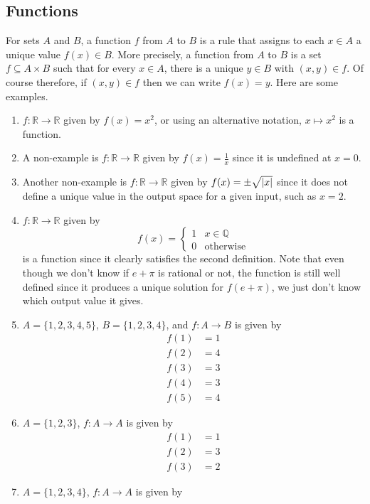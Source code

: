 \documentclass{article}
\begin{document}
	\subsection{Functions}
	For sets $A$ and $B$, a function $f$ from $A$ to $B$ is a rule that assigns to each $x \in A$ a unique value $f(x) \in B$. More precisely, a function from $A$ to $B$ is a set $f \subseteq A \times B$ such that for every $x \in A$, there is a unique $y \in B$ with $(x, y) \in f$. Of course therefore, if $(x, y) \in f$ then we can write $f(x) = y$. Here are some examples.
	\begin{enumerate}
		\item $f\colon \mathbb R \to \mathbb R$ given by $f(x) = x^2$, or using an alternative notation, $x \mapsto x^2$ is a function.
		\item A non-example is $f\colon \mathbb R \to \mathbb R$ given by $f(x) = \frac{1}{x}$ since it is undefined at $x=0$.
		\item Another non-example is $f\colon \mathbb R \to \mathbb R$ given by $f(x) = \pm \sqrt{\abs{x}}$ since it does not define a unique value in the output space for a given input, such as $x=2$.
		\item $f\colon \mathbb R \to \mathbb R$ given by
		\[ f(x) = \begin{cases}
			1 & x \in \mathbb Q \\
			0 & \text{otherwise}
		\end{cases} \]
		is a function since it clearly satisfies the second definition. Note that even though we don't know if $e + \pi$ is rational or not, the function is still well defined since it produces a unique solution for $f(e + \pi)$, we just don't know which output value it gives.
		\item $A = \{ 1, 2, 3, 4, 5 \}$, $B = \{ 1, 2, 3, 4 \}$, and $f\colon A \to B$ is given by
		\begin{align*}
			f(1) &= 1 \\
			f(2) &= 4 \\
			f(3) &= 3 \\
			f(4) &= 3 \\
			f(5) &= 4
		\end{align*}
		\item $A = \{ 1, 2, 3 \}$, $f\colon A \to A$ is given by
		\begin{align*}
			f(1) &= 1 \\
			f(2) &= 3 \\
			f(3) &= 2
		\end{align*}
		\item $A = \{ 1, 2, 3, 4 \}$, $f\colon A \to A$ is given by

\end{enumerate}
\end{document}
